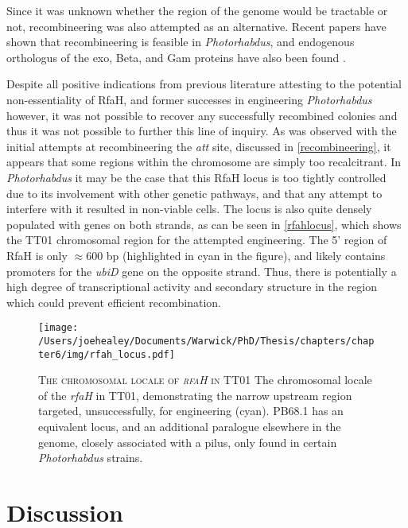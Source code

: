 Since it was unknown whether the region of the genome would be tractable or not, recombineering was also attempted as an alternative. Recent papers have shown that recombineering is feasible in \emph{Photorhabdus}, and endogenous orthologus of the exo, Beta, and Gam proteins have also been found \citep{Yin2015}.

Despite all positive indications from previous literature attesting to the potential non-essentiality of RfaH, and former successes in engineering \emph{Photorhabdus} however, it was not possible to recover any successfully recombined colonies and thus it was not possible to further this line of inquiry. As was observed with the initial attempts at recombineering the \emph{att} site, discussed in \vref{recombineering}, it appears that some regions within the chromosome are simply too recalcitrant. In \emph{Photorhabdus} it may be the case that this RfaH locus is too tightly controlled due to its involvement with other genetic pathways, and that any attempt to interfere with it resulted in non-viable cells. The locus is also quite densely populated with genes on both strands, as can be seen in \vref{rfahlocus}, which shows the \Plum{} TT01 chromosomal region for the attempted engineering. The 5' region of RfaH is only $\approx$600 bp (highlighted in cyan in the figure), and likely contains promoters for the \emph{ubiD} gene on the opposite strand. Thus, there is potentially a high degree of transcriptional activity and secondary structure in the region which could prevent efficient recombination.

\begin{figure}[h!]
    \texttt{[image: /Users/joehealey/Documents/Warwick/PhD/Thesis/chapters/chapter6/img/rfah\_locus.pdf]}
    \captionsetup{singlelinecheck=off, justification=justified, font=footnotesize, aboveskip=5pt}
    \caption[RfaH locale in \Plum{} TT01]{\textsc{\normalsize The chromosomal locale of \emph{rfaH} in \Plum{} TT01} \vspace{0.1cm} \newline The chromosomal locale of the \emph{rfaH} in \Plum{} TT01, demonstrating the narrow upstream region targeted, unsuccessfully, for engineering (cyan). \Pasy{} PB68.1 has an equivalent locus, and an additional paralogue elsewhere in the genome, closely associated with a pilus, only found in certain \emph{Photorhabdus} strains.}
\label{rfahlocus}
\end{figure}

\clearpage
\section{Discussion}

